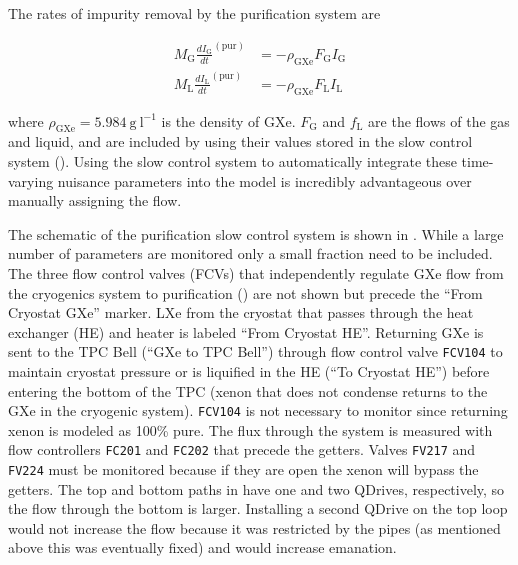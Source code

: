 The rates of impurity removal by the purification system are

\vspace{-20pt}

\begin{subequations}
\begin{align}
M_{\mathrm{G}} \frac{dI_{\mathrm{G}}}{dt}^{(\mathrm{pur})} &= -\rho_{\mathrm{GXe}} F_{\mathrm{G}} I_{\mathrm{G}}
\label{eq:electron_lifetime_model_removal_gxe}
\\
M_{\mathrm{L}} \frac{dI_{\mathrm{L}}}{dt}^{(\mathrm{pur})} &= -\rho_{\mathrm{GXe}} F_{\mathrm{L}} I_{\mathrm{L}}
\label{eq:electron_lifetime_model_removal_lxe}
\end{align}
\end{subequations}

\noindent where $\rho_{\mathrm{GXe}} = 5.984\ \mathrm{g\ l^{-1}}$ is the density of GXe.  $F_{\mathrm{G}}$ and $f_{\mathrm{L}}$ are the
flows of the gas and liquid, and are included by using their values stored in the slow control system
().  Using the slow control system to automatically integrate these time-varying nuisance
parameters into the model is incredibly advantageous over manually assigning the flow.

The schematic of the purification slow control system is shown in .  While a large
number of parameters are monitored only a small fraction need to be included.  The three flow control valves (FCVs) that independently
regulate GXe flow from the cryogenics system to purification () are not shown but precede the
``From Cryostat GXe'' marker.  LXe from the cryostat that passes
through the heat exchanger (HE) and heater is labeled ``From Cryostat HE''.  Returning GXe is sent to the TPC Bell (``GXe to TPC Bell'')
through flow control valve \texttt{FCV104} to maintain cryostat pressure or is liquified in the HE (``To
Cryostat HE'') before entering the bottom of the TPC (xenon that does not
condense returns to the GXe in the cryogenic system).  \texttt{FCV104} is not necessary to monitor since returning xenon is modeled
as 100\% pure.  The flux through the system is
measured with flow controllers \texttt{FC201} and \texttt{FC202} that precede the getters.  Valves
\texttt{FV217} and \texttt{FV224} must be monitored because if they are open the xenon will bypass the getters.  The top and bottom
paths in  have one
and two QDrives, respectively, so the flow through the bottom is larger.  Installing a second QDrive on the top loop would not
increase the flow because it was restricted by the pipes (as mentioned above this was eventually fixed) and would increase 
emanation.

